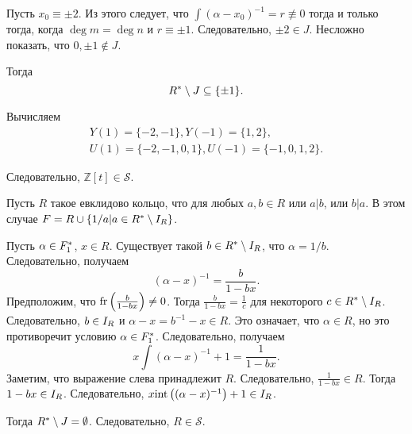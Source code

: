 \documentclass[_00_dissertation.tex]{subfiles}
\begin{document}
\begin{example}
    Пусть $x_0 \equiv \pm 2$.
    Из этого следует, что $\int{(\alpha - x_0)^{-1}} = r \not\equiv 0$ тогда и только тогда, когда $\deg m = \deg n$ и $r \equiv \pm 1$.
    Следовательно, $\pm 2 \in J$.
    Несложно показать, что $0, \pm 1 \not\in J$.
    
    Тогда
    \begin{equation*}
        R^{*} \setminus J \subseteq \{\pm1\}.
    \end{equation*}

    Вычисляем
    \begin{equation*}
        \begin{split}
            Y(1) = \{-2, -1\}, Y(-1) = \{1, 2\},\\
            U(1) = \{-2, -1, 0, 1\}, U(-1) = \{-1, 0, 1, 2\}.
        \end{split}
    \end{equation*}

    Следовательно, $\mathbb{Z}[t] \in \mathcal{S}.$
\end{example}

\begin{example}\label{example:a|b or b|a}
    Пусть $R$ такое евклидово кольцо, что для любых $a, b \in R$ или $a|b$, или $b|a$.
    В этом случае $F = R \cup \{1/a | a \in R^{*} \setminus I_{R}\}$.

    Пусть $\alpha \in F_1^{*}$, $x \in R$.
    Существует такой $b \in R^{*} \setminus I_{R}$, что $\alpha = 1/b$.
    Следовательно, получаем
    \begin{equation*}
        (\alpha - x)^{-1} = \frac{b}{1 - b x}.
    \end{equation*}
    Предположим, что $\textrm{fr}\left(\frac{b}{1 - bx}\right) \neq 0$.
    Тогда $\frac{b}{1 - b x} = \frac{1}{c}$ для некоторого $c \in R^{*} \setminus I_{R}$.
    Следовательно, $b \in I_{R}$ и $\alpha - x = b^{-1} - x \in R$.
    Это означает, что $\alpha \in R$, но это противоречит условию $\alpha \in F_1^{*}$.
    Следовательно, получаем
    \begin{equation*}
        x \int{(\alpha - x)^{-1}} + 1 = \frac{1}{1 - b x}.
    \end{equation*}
    Заметим, что выражение слева принадлежит $R$.
    Следовательно, $\frac{1}{1 - b x} \in R$.
    Тогда $1 - b x \in I_{R}$.
    Следовательно, $x \textrm{int}\left((\alpha-x)^{-1}\right) + 1 \in I_{R}$.
    
    Тогда $R^{*} \setminus J = \emptyset$.
    Следовательно, $R \in \mathcal{S}$.
\end{example}
\end{document}
